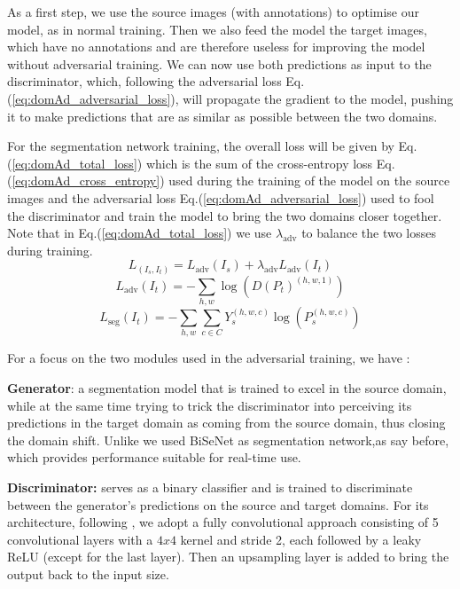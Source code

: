 \documentclass[10pt,twocolumn,letterpaper]{article}
\begin{document}
As a first step, we use the source images (with annotations) to optimise our model, as in normal training. Then we also feed the model the target images, which have no annotations and are therefore useless for improving the model without adversarial training. We can now use both predictions as input to the discriminator, which, following the adversarial loss Eq.(\ref{eq:domAd_adversarial_loss}), will propagate the gradient to the model, pushing it to make predictions that are as similar as possible between the two domains.

For the segmentation network training, the overall loss will be given by Eq.(\ref{eq:domAd_total_loss}) which is the sum of the cross-entropy loss Eq.(\ref{eq:domAd_cross_entropy}) used during the training of the model on the source images and the adversarial loss Eq.(\ref{eq:domAd_adversarial_loss}) used to fool the discriminator and train the model to bring the two domains closer together.
Note that in Eq.(\ref{eq:domAd_total_loss}) we use $\lambda_{\text{adv}}$ to balance the two losses during training.\\

\begin{equation}
L_(I_s,I_t) =L_{\text{adv}}(I_s) + \lambda_{\text{adv}} L_{\text{adv}}(I_t)
\label{eq:domAd_total_loss}
\end{equation}
\begin{equation}
L_{\text{adv}}(I_t) = -\sum_{h,w} \log(D(P_t)^{(h,w,1)})
\label{eq:domAd_adversarial_loss}
\end{equation}
\begin{equation}
L_{\text{seg}}(I_t) = -\sum_{h,w} \sum_{c \in C} Y_s^{(h,w,c)} \log(P_s^{(h,w,c)})
\label{eq:domAd_cross_entropy}
\end{equation}

For a focus on the two modules used in the adversarial training, we have :

\textbf{Generator}: a segmentation model that is trained to excel in the source domain, while at the same time trying to trick the discriminator into perceiving its predictions in the target domain as coming from the source domain, thus closing the domain shift. Unlike \cite{DomAd} we used BiSeNet as segmentation network,as say before, which provides performance suitable for real-time use.

\textbf{Discriminator:} serves as a binary classifier and is trained to discriminate between the generator's predictions on the source and target domains. For its architecture, following \cite{DomAd}, we adopt a fully convolutional approach consisting of 5 convolutional layers with a $4x4$ kernel and stride 2, each followed by a leaky ReLU (except for the last layer). Then an upsampling layer is added to bring the output back to the input size.
\end{document}
